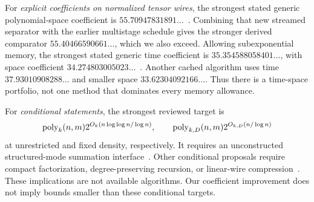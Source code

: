 For \emph{explicit coefficients on normalized tensor wires}, the strongest
stated generic polynomial-space coefficient is
$55.70947831891\ldots$~\cite{adaptive}. Combining that new streamed
separator with the earlier multistage schedule gives the stronger derived
comparator $55.40466590661\ldots$, which we also exceed. Allowing subexponential memory, the strongest
stated generic time coefficient is $35.354588058401\ldots$, with space
coefficient $34.274803005023\ldots$~\cite{frontier,tree}.
Another cached algorithm uses time $37.93010908288\ldots$ and smaller
space $33.62304092166\ldots$. Thus there is a time-space portfolio,
not one method that dominates every memory allowance.

For \emph{conditional statements}, the strongest reviewed target is
\[
 \operatorname{poly}_k(n,m)2^{O_k(n\log\log n/\log n)},\qquad
 \operatorname{poly}_{k,D}(n,m)2^{O_{k,D}(n/\log n)}
\]
at unrestricted and fixed density, respectively. It requires an
unconstructed structured-mode summation interface~\cite{precision}.
Other conditional proposals require compact factorization,
degree-preserving recursion, or linear-wire compression~\cite{scalar,analysis}.
These implications are not available algorithms. Our coefficient
improvement does not imply bounds smaller than these conditional targets.


